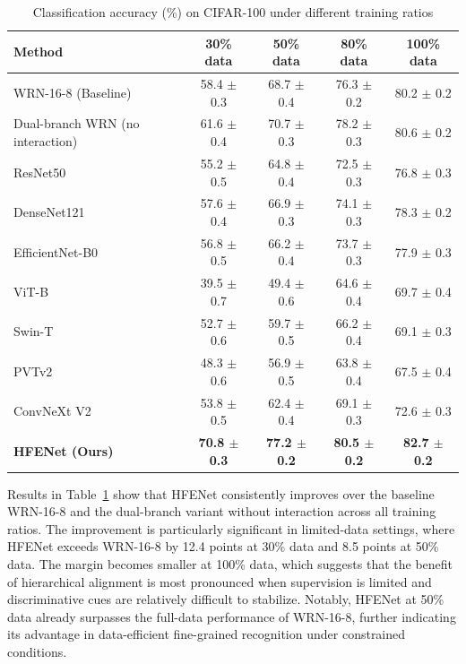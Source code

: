 \documentclass[pdflatex,iicol,sn-mathphys-num]{sn-jnl}
\theoremstyle{thmstyleone}%
\theoremstyle{thmstyletwo}%
\theoremstyle{thmstylethree}%
\begin{document}
\begin{table}[h]
    \centering
    \caption{Classification accuracy (\%) on CIFAR-100 under different training ratios}
    \label{tab:cifar100_data_ratio}
    \setlength{\tabcolsep}{4pt}
    \renewcommand{\arraystretch}{1.0}
    \small
    \begin{tabular}{@{}lcccc@{}}
    \toprule
    \textbf{Method} & \textbf{30\% data} & \textbf{50\% data} & \textbf{80\% data} & \textbf{100\% data} \\
    \midrule
    WRN-16-8 (Baseline) & 58.4 $\pm$ 0.3 & 68.7 $\pm$ 0.4 & 76.3 $\pm$ 0.2 & 80.2 $\pm$ 0.2 \\
    Dual-branch WRN (no interaction) & 61.6 $\pm$ 0.4 & 70.7 $\pm$ 0.3 & 78.2 $\pm$ 0.3 & 80.6 $\pm$ 0.2 \\
    ResNet50 & 55.2 $\pm$ 0.5 & 64.8 $\pm$ 0.4 & 72.5 $\pm$ 0.3 & 76.8 $\pm$ 0.3 \\
    DenseNet121 & 57.6 $\pm$ 0.4 & 66.9 $\pm$ 0.3 & 74.1 $\pm$ 0.3 & 78.3 $\pm$ 0.2 \\
    EfficientNet-B0 & 56.8 $\pm$ 0.5 & 66.2 $\pm$ 0.4 & 73.7 $\pm$ 0.3 & 77.9 $\pm$ 0.3 \\
    ViT-B & 39.5 $\pm$ 0.7 & 49.4 $\pm$ 0.6 & 64.6 $\pm$ 0.4 & 69.7 $\pm$ 0.4 \\
    Swin-T & 52.7 $\pm$ 0.6 & 59.7 $\pm$ 0.5 & 66.2 $\pm$ 0.4 & 69.1 $\pm$ 0.3 \\
    PVTv2 & 48.3 $\pm$ 0.6 & 56.9 $\pm$ 0.5 & 63.8 $\pm$ 0.4 & 67.5 $\pm$ 0.4 \\
    ConvNeXt V2 & 53.8 $\pm$ 0.5 & 62.4 $\pm$ 0.4 & 69.1 $\pm$ 0.3 & 72.6 $\pm$ 0.3 \\
    \midrule
    \textbf{HFENet (Ours)} & \textbf{70.8 $\pm$ 0.3} & \textbf{77.2 $\pm$ 0.2} & \textbf{80.5 $\pm$ 0.2} & \textbf{82.7 $\pm$ 0.2} \\
    \bottomrule
    \end{tabular}
\end{table}

Results in Table~\ref{tab:cifar100_data_ratio} show that HFENet consistently improves over the baseline WRN-16-8 and the dual-branch variant without interaction across all training ratios. The improvement is particularly significant in limited-data settings, where HFENet exceeds WRN-16-8 by 12.4 points at 30\% data and 8.5 points at 50\% data. The margin becomes smaller at 100\% data, which suggests that the benefit of hierarchical alignment is most pronounced when supervision is limited and discriminative cues are relatively difficult to stabilize. Notably, HFENet at 50\% data already surpasses the full-data performance of WRN-16-8, further indicating its advantage in data-efficient fine-grained recognition under constrained conditions.
\end{document}
